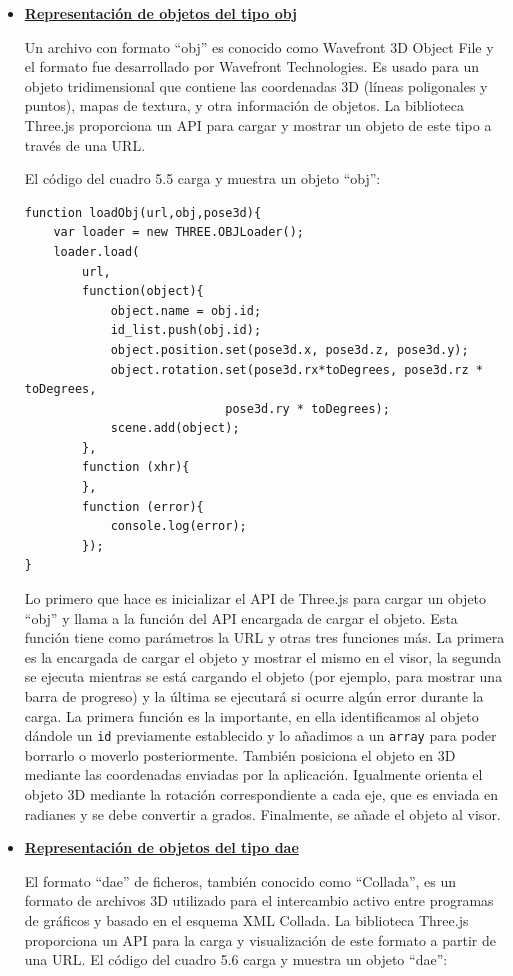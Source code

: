 \begin{itemize}
\item {\textbf{\underline{Representación de objetos del tipo obj}}

Un archivo con formato ``obj'' es conocido como Wavefront 3D Object File y el formato fue desarrollado por Wavefront Technologies. Es usado para un objeto tridimensional que contiene las coordenadas 3D (líneas poligonales y puntos), mapas de textura, y otra información de objetos. La biblioteca Three.js proporciona un API para cargar y mostrar un objeto de este tipo a través de una URL. 

El código del cuadro 5.5 carga y muestra un objeto ``obj'':


\begin{lstlisting}[caption= Carga y visualización de objetos ``obj'', label=cod.objetosobj]
function loadObj(url,obj,pose3d){
	var loader = new THREE.OBJLoader();
	loader.load(
		url,
		function(object){
			object.name = obj.id;
			id_list.push(obj.id);
			object.position.set(pose3d.x, pose3d.z, pose3d.y);
			object.rotation.set(pose3d.rx*toDegrees, pose3d.rz * toDegrees, 
							pose3d.ry * toDegrees);
			scene.add(object);
		},
		function (xhr){
		},
		function (error){
			console.log(error);
		});
}
\end{lstlisting}

Lo primero que hace es inicializar el API de Three.js para cargar un objeto ``obj'' y llama a la función del API encargada de cargar el objeto. Esta función tiene como parámetros la URL y otras tres funciones más. La primera es la encargada de cargar el objeto y mostrar el mismo en el visor, la segunda se ejecuta mientras se está cargando el objeto (por ejemplo, para mostrar una barra de progreso) y la última se ejecutará si ocurre algún error durante la carga. La primera función es la importante, en ella identificamos al objeto dándole un \texttt{id} previamente establecido y lo añadimos a un \texttt{array} para poder borrarlo o moverlo posteriormente. También posiciona el objeto en 3D mediante las coordenadas enviadas por la aplicación. Igualmente orienta el objeto 3D mediante la rotación correspondiente a cada eje, que es enviada en radianes y se debe convertir a grados.
Finalmente, se añade el objeto al visor.}

\item{\textbf{\underline{Representación de objetos del tipo dae}}

El formato ``dae'' de ficheros, también conocido como ``Collada'', es un formato de archivos 3D utilizado para el intercambio activo entre programas de gráficos y basado en el esquema XML Collada. La biblioteca Three.js proporciona un API para la carga y visualización de este formato a partir de una URL. El código del cuadro 5.6 carga y muestra un objeto ``dae'':

}
\end{itemize}
